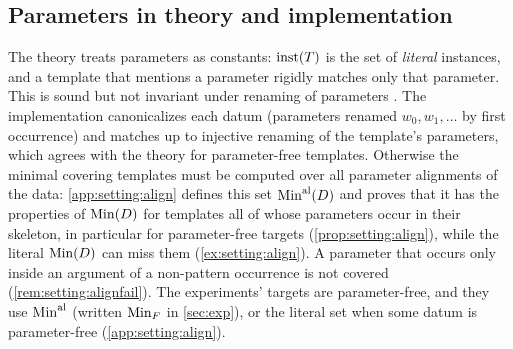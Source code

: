 \subsection{Parameters in theory and implementation}\label{sec:setting:params}

The theory treats parameters as constants: $\mathrm{inst}(T)$ is the set of \emph{literal} instances, and a template that mentions a parameter rigidly matches only that parameter. This is sound but not invariant under renaming of parameters . The implementation canonicalizes each datum (parameters renamed $w_0,w_1,\dots$ by first occurrence) and matches up to injective renaming of the template's parameters, which agrees with the theory for parameter-free templates. Otherwise the minimal covering templates must be computed over all parameter alignments of the data: \cref{app:setting:align} defines this set $\mathrm{Min}^{\mathrm{al}}(D)$ and proves that it has the properties of $\mathrm{Min}(D)$ for templates all of whose parameters occur in their skeleton, in particular for parameter-free targets (\cref{prop:setting:align}), while the literal $\mathrm{Min}(D)$ can miss them (\cref{ex:setting:align}). A parameter that occurs only inside an argument of a non-pattern occurrence is not covered (\cref{rem:setting:alignfail}). The experiments' targets are parameter-free, and they use $\mathrm{Min}^{\mathrm{al}}$ (written $\mathrm{Min}_F$ in \cref{sec:exp}), or the literal set when some datum is parameter-free (\cref{app:setting:align}).
